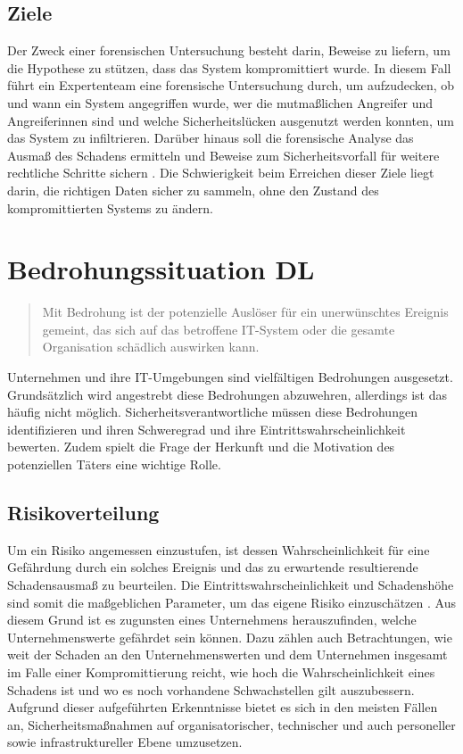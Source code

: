 \documentclass[12pt,DIV=14, version=first, BCOR=10mm,a4paper,twoside,parskip=half-,headsepline,headinclude]{scrartcl}
\begin{document}
	\subsection{Ziele}
	Der Zweck einer forensischen Untersuchung besteht darin, Beweise zu liefern, um die Hypothese zu stützen, dass das System kompromittiert wurde. In diesem Fall führt ein Expertenteam eine forensische Untersuchung durch, um aufzudecken, ob und wann ein System angegriffen wurde, wer die mutmaßlichen Angreifer und Angreiferinnen sind und welche Sicherheitslücken ausgenutzt werden konnten, um das System zu infiltrieren. Darüber hinaus soll die forensische Analyse das Ausmaß des Schadens ermitteln und Beweise zum Sicherheitsvorfall für weitere rechtliche Schritte sichern \cite[vgl. S. 65]{texbook01}. Die Schwierigkeit beim Erreichen dieser Ziele liegt darin, die richtigen Daten sicher zu sammeln, ohne den Zustand des kompromittierten Systems zu ändern.

\section{Bedrohungssituation DL}
\begin{quote}
    \glqq
    Mit Bedrohung ist der potenzielle Auslöser für ein unerwünschtes Ereignis gemeint, das sich auf das betroffene IT-System oder die gesamte Organisation schädlich auswirken kann. 
    \grqq
    \cite[S.11]{texbook01}
\end{quote}

Unternehmen und ihre IT-Umgebungen sind vielfältigen Bedrohungen ausgesetzt.
Grundsätzlich wird angestrebt diese Bedrohungen abzuwehren, allerdings ist das häufig nicht möglich. Sicherheitsverantwortliche müssen diese Bedrohungen identifizieren und ihren Schweregrad und ihre Eintrittswahrscheinlichkeit bewerten. Zudem spielt die Frage der Herkunft und die Motivation des potenziellen Täters eine wichtige Rolle.


    \subsection{Risikoverteilung}
    Um ein Risiko angemessen einzustufen, ist dessen Wahrscheinlichkeit für eine Gefährdung durch ein solches Ereignis und das zu erwartende resultierende Schadensausmaß zu beurteilen. Die Eintrittswahrscheinlichkeit und Schadenshöhe sind somit die maßgeblichen Parameter, um das eigene Risiko einzuschätzen \cite[vgl. S. 12]{texbook01}.
    Aus diesem Grund ist es zugunsten eines Unternehmens herauszufinden, welche Unternehmenswerte gefährdet sein können. Dazu zählen auch Betrachtungen, wie weit der Schaden an den Unternehmenswerten und dem Unternehmen insgesamt im Falle einer Kompromittierung reicht, wie hoch die Wahrscheinlichkeit eines Schadens ist und wo es noch vorhandene Schwachstellen gilt auszubessern.
    Aufgrund dieser aufgeführten Erkenntnisse bietet es sich in den meisten Fällen an, Sicherheitsmaßnahmen auf organisatorischer, technischer und auch personeller sowie infrastruktureller Ebene umzusetzen.
\end{document}
